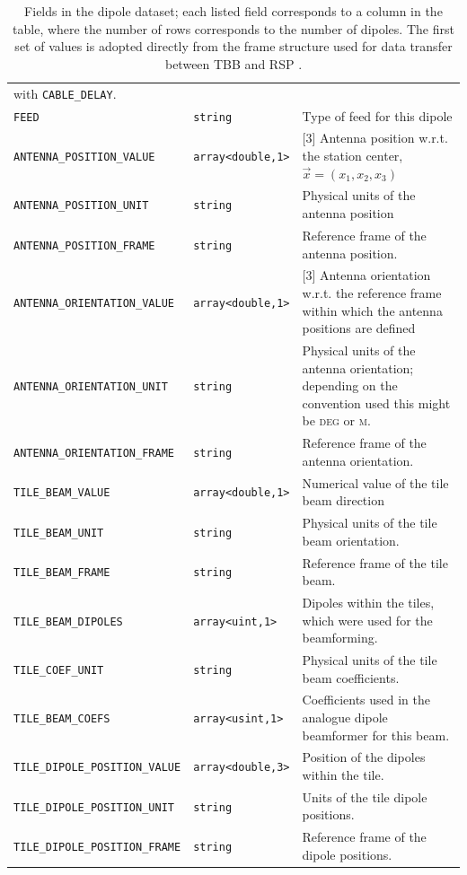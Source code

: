 \documentclass[a4paper,10pt,bibtotoc]{scrartcl}
\begin{document}
\begin{table}[htbp]
\begin{tabular}{|llp{7.5cm}|}
    with \verb|CABLE_DELAY|. \\
    \verb|FEED| & \verb|string| & Type of feed for this dipole \\
    \verb|ANTENNA_POSITION_VALUE| & \verb|array<double,1>| &
    [3] Antenna position w.r.t. the station center, $\vec x = (x_1,x_2,x_3)$ \\
    \verb|ANTENNA_POSITION_UNIT| & \verb|string| & Physical units
    of the antenna position \\
    \verb|ANTENNA_POSITION_FRAME| & \texttt{string} & Reference frame of the antenna position. \\
    \verb|ANTENNA_ORIENTATION_VALUE| & \verb|array<double,1>| & [3] Antenna orientation w.r.t. the reference frame within which the antenna positions are defined \\
    \verb|ANTENNA_ORIENTATION_UNIT| & \verb|string| & Physical
    units of the antenna orientation; depending on the convention used this might
    be \textsc{deg} or \textsc{m}. \\
    \verb|ANTENNA_ORIENTATION_FRAME| & \texttt{string} & Reference frame of the antenna orientation. \\
    \verb|TILE_BEAM_VALUE| & \verb|array<double,1>| &
    Numerical value of the tile beam direction \\
    \verb|TILE_BEAM_UNIT| & \verb|string| & Physical
    units of the tile beam orientation. \\
    \verb|TILE_BEAM_FRAME| & \texttt{string} & Reference frame of the tile beam.  \\
    \verb|TILE_BEAM_DIPOLES| & \verb|array<uint,1>| & Dipoles
    within the tiles, which were used for the beamforming.  \\
    \verb|TILE_COEF_UNIT| & \verb|string| & Physical units of the
    tile beam coefficients.\\
    \verb|TILE_BEAM_COEFS| & \verb|array<usint,1>| & Coefficients used
    in the analogue dipole beamformer for this beam.  \\
    \verb|TILE_DIPOLE_POSITION_VALUE| & \verb|array<double,3>| & Position of the dipoles within the tile. \\
    \verb|TILE_DIPOLE_POSITION_UNIT| & \verb|string| & Units of the tile dipole positions.\\
    \verb|TILE_DIPOLE_POSITION_FRAME| & \verb|string| & Reference frame of the dipole positions.\\
   \hline
  \end{tabular}
  \caption{Fields in the dipole dataset; each listed field
    corresponds to a column in the table, where the number of rows corresponds
    to the number of dipoles. The first set of values is adopted directly from
    the frame structure used for data transfer between TBB and RSP
    \cite{poiesz.2006}.}
  \label{tab:ANTENNA_TABLE}
\end{table}
\end{document}
